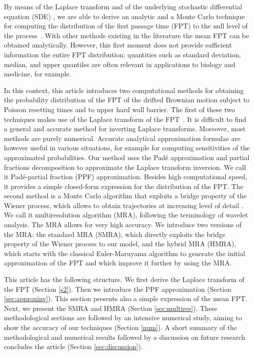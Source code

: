 \documentclass[preprint,12pt]{elsarticle}
\numberwithin{equation}{section}
\theoremstyle{plain} \newtheorem{theorem}{Theorem}[section]
\theoremstyle{plain} \newtheorem{proposition}[theorem]{Proposition}
\theoremstyle{plain} \newtheorem{lemma}[theorem]{Lemma}
\theoremstyle{plain} \newtheorem{corollary}[theorem]{Corollary}
\theoremstyle{definition} \newtheorem{definition}[theorem]{Definition}
\theoremstyle{definition} \newtheorem{notation}[theorem]{Notation}
\theoremstyle{remark} \newtheorem{remark}[theorem]{Remark}
\theoremstyle{remark} \newtheorem{remarks}[theorem]{Remarks}
\theoremstyle{remark} \newtheorem{algorithm2}[theorem]{Algorithm}
\theoremstyle{remark} \newtheorem{example}[theorem]{Example}
\begin{document}
By means of the Laplace transform and of the
underlying stochastic differential equation (SDE) \cite{pavliotis_stochastic_2014, karlin_taylor_1981},
we are able to derive an analytic and a Monte Carlo
technique for computing the distribution of the 
first passage time (FPT) to the null level of the 
process~\cite{redner2001guide,iyer2016first,aguilar2023endemic,zhang2016first,Chicheportiche2014,Masoliver2014,Maggiore2014,Barkai2014}.
With other methods existing in the literature the mean FPT can be obtained analytically. However, this first moment does not provide sufficient information the entire FPT distribution: quantities such as standard deviation, median, and upper quantiles are often relevant in applications to biology and medicine, for example. 

In this context, this article introduces two computational methods for obtaining the probability distribution of the FPT of the drifted Brownian motion subject to Poisson resetting times and to upper hard wall barrier. The first of these two techniques makes use of the Laplace transform of the FPT~\cite{ramoso_stochastic_2020}. It is difficult to find a general and accurate method for inverting Laplace transforms.
Moreover, most methods are purely numerical. Accurate analytical approximation formulae are however useful in various situations, for example for computing sensitivities of the approximated probabilities.
Our method uses the Pad\'e approximation and partial fractions decomposition to approximate the Laplace transform inversion. We call it Pad\'e-partial fraction (PPF) approximation.
Besides high computational speed, it provides a simple closed-form
expression for the distribution of the FPT.
The second method is a Monte Carlo algorithm that
exploits a bridge property of the Wiener process, which
allows to obtain trajectories at increasing level of detail \cite{Davies1979, asmussen2007stochastic}. We call it multiresolution algorithm (MRA), following the terminology of wavelet
analysis. The MRA allows for very high accuracy.
We introduce two versions of the MRA: the standard MRA (SMRA), which directly exploits the bridge property of the Wiener process to our model, and the hybrid MRA (HMRA), which starts with the classical Euler-Maruyama algorithm to generate the initial approximation of the FPT and which improve it further by using the MRA. 

This article has the following structure. 
We first derive the Laplace transform of the FPT (Section \ref{s2}). Then
we introduce the PPF approximation (Section \ref{sec:approxinv}). 
This section presents also a simple
expression of the mean FPT.
Next, we present the SMRA and HMRA
(Section \ref{sec:multires}). These methodological
sections are followed by an intensive numerical
study, aiming to show the accuracy of our techniques
(Section \ref{num}).
A short summary of the methodological and numerical
results followed by a discussion on future research 
concludes the article (Section \ref{sec:discussion}).
\\
\end{document}
